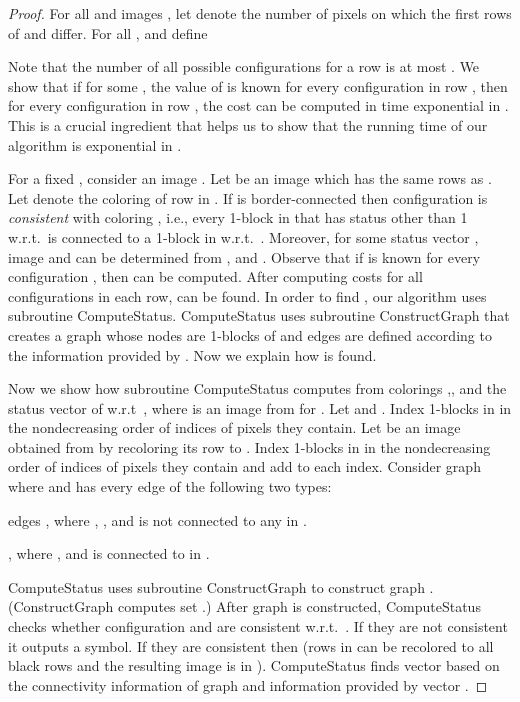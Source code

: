 \documentclass[11pt,english]{article}
\renewenvironment{enumerate}[1]{\begin{compactenum}#1}{\end{compactenum}}
\numberwithin{figure}{section}
\newcommand{\Compst}{{\sf ComputeStatus}\xspace}
\newcommand{\Constgr}{{\sf ConstructGraph}\xspace}
\begin{document}
\begin{proof}
{For all  and  images , let  denote the number of pixels on which the first  rows of  and  differ. For all , and  define

Note that the number of all possible configurations for a row is at most . We show that if for some , the value of  is known for every configuration  in row , then for every configuration  in row , the cost  can be computed in time exponential in . This is a crucial ingredient that helps us to show that the running time of our algorithm is exponential in .

For a fixed , consider an image . Let  be an image which has the same  rows as . Let  denote the coloring of row  in . If  is border-connected then configuration  is {\em consistent} with coloring , i.e., every 1-block in  that has status other than 1 w.r.t.\  is connected to a 1-block in  w.r.t.\ . Moreover, for some status vector , image  and  can be determined from , and . Observe that if  is known for every configuration , then  can be computed. After computing costs for all configurations in each row,  can be found. In order to find , our algorithm uses subroutine \Compst. \Compst uses subroutine \Constgr that creates a graph whose nodes are 1-blocks of  and edges are defined according to the information provided by . Now we explain how  is found. }



Now we show how subroutine \Compst computes  from colorings ,, and the status vector  of  w.r.t\ , where  is an image from  for . Let  and . Index 1-blocks in  in the nondecreasing order of indices of pixels they contain. Let  be an image obtained from  by recoloring its row  to . Index 1-blocks in  in the nondecreasing order of indices of pixels they contain and add  to each index. Consider graph  where  and  has every edge of the following two types:
\begin{enumerate}
\item edges , where , , and  is not connected to any  in  .
\item , where , and  is connected to  in .
\end{enumerate}

\Compst uses subroutine \Constgr to construct graph . (\Constgr computes set .)
After graph  is constructed, \Compst checks whether configuration   and  are consistent w.r.t.\ . If they are not consistent it outputs a  symbol. If they are consistent then  (rows  in  can be recolored to all black rows and the resulting image is in ). \Compst finds vector  based on the connectivity information of graph  and information provided by vector .



\end{proof}
\end{document}
